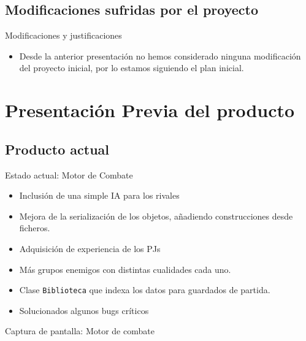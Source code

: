\documentclass[9pt,xcolor=svgnames]{beamer}
\begin{document}
   
   
   \subsection{Modificaciones sufridas por el proyecto}
   
   \begin{frame}{Modificaciones y justificaciones}
    
    \begin{itemize}
     \item Desde la anterior presentación no hemos considerado
	   ninguna modificación del proyecto inicial, por lo
	   estamos siguiendo el plan inicial.
	 
    \end{itemize}    
    
   \end{frame}
   
   
 \section{Presentación Previa del producto}
 
   \subsection{Producto actual}

   \begin{frame}{Estado actual: Motor de Combate}
    \begin{itemize}
     \item Inclusión de una simple IA para los rivales
     \item Mejora de la serialización de los objetos, añadiendo
	   construcciones desde ficheros.
     \item Adquisición de experiencia de los PJs
     \item Más grupos enemigos con distintas cualidades cada uno.
     \item Clase \texttt{Biblioteca} que indexa los datos para 
	   guardados de partida.
     \item Solucionados algunos bugs críticos
    \end{itemize}
   \end{frame}

   \begin{frame}{Captura de pantalla: Motor de combate}
    
   \end{frame}
\end{document}
